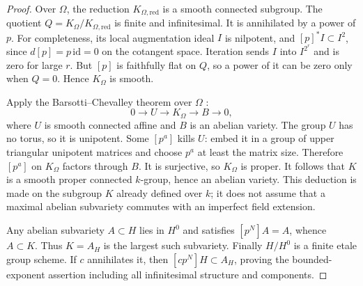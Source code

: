\begin{proof}
Over $\Omega$, the reduction $K_{\Omega,\mathrm{red}}$ is a smooth
connected subgroup.  The quotient
$Q=K_\Omega/K_{\Omega,\mathrm{red}}$ is finite and infinitesimal.
It is annihilated by a power of $p$.  For completeness, its local
augmentation ideal $I$ is nilpotent, and $[p]^*I\subset I^2$, since
$d[p]=p\,\mathrm{id}=0$ on the cotangent space.  Iteration sends $I$
into $I^{2^r}$ and is zero for large $r$.
But $[p]$ is faithfully flat on $Q$, so a power of it can be zero only
when $Q=0$.  Hence $K_\Omega$ is smooth.

Apply the Barsotti--Chevalley theorem over $\Omega$
\cite[Theorem 8.27, pp.~154--155]{MilneAG2022B}:
\[
 0\longrightarrow U\longrightarrow K_\Omega\longrightarrow B
 \longrightarrow0,
\]
where $U$ is smooth connected affine and $B$ is an abelian variety.
The group $U$ has no torus, so it is unipotent.  Some $[p^a]$ kills
$U$: embed it in a group of upper triangular unipotent matrices and
choose $p^a$ at least the matrix size.  Therefore $[p^a]$ on $K_\Omega$
factors through $B$.  It is surjective, so $K_\Omega$ is proper.
It follows that $K$ is a smooth proper connected $k$-group, hence an
abelian variety.  This deduction is made on the subgroup $K$ already
defined over $k$; it does not assume that a maximal abelian subvariety
commutes with an imperfect field extension.

Any abelian subvariety $A\subset H$ lies in $H^0$ and satisfies
$[p^N]A=A$, whence $A\subset K$.  Thus $K=A_H$ is the largest such
subvariety.  Finally $H/H^0$ is a finite etale group scheme.  If $c$
annihilates it, then $[cp^N]H\subset A_H$, proving the bounded-exponent
assertion including all infinitesimal structure and components.


\end{proof}
